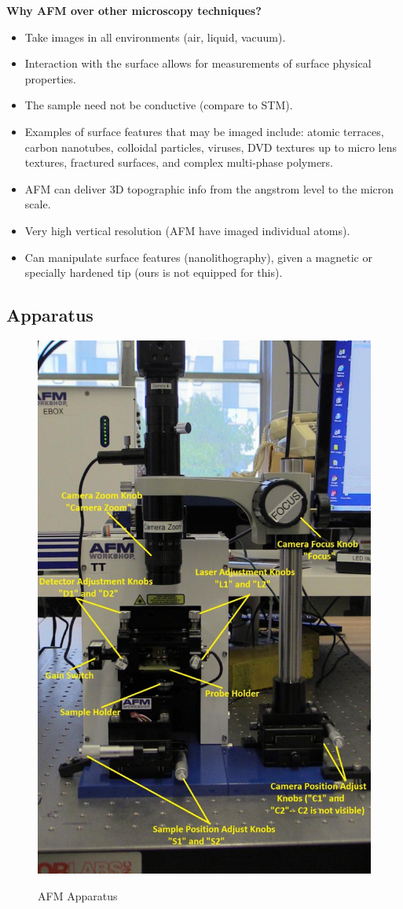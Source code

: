 \documentclass{../lab}
\begin{document}
\textbf{Why AFM over other microscopy techniques?}
\begin{itemize}
    \item Take images in all environments (air, liquid, vacuum).

    \item Interaction with the surface allows for measurements of surface physical properties.

    \item The sample need not be conductive (compare to STM).

    \item Examples of surface features that may be imaged include: atomic terraces, carbon nanotubes, colloidal particles, viruses, DVD textures up to micro lens textures, fractured surfaces, and complex multi-phase polymers.

    \item AFM can deliver 3D topographic info from the angstrom level to the micron scale.

    \item Very high vertical resolution (AFM have imaged individual atoms).

    \item Can manipulate surface features (nanolithography), given a magnetic or specially hardened tip (ours is not equipped for this).

\end{itemize}

\subsection{Apparatus}

\begin{figure}[h]
\centering
    \href{http://experimentationlab.berkeley.edu/sites/default/files/AFMImages/AFMgen.jpg}{\includegraphics[width=0.5\linewidth]{images/AFMgen.jpg}}
    \caption{AFM Apparatus}
\end{figure}
\end{document}
